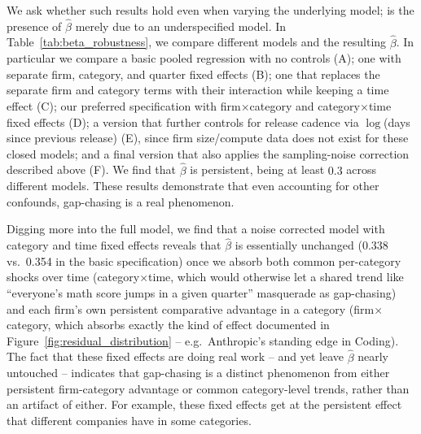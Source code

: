 We ask whether such results hold even when varying the underlying model; is the presence of $\hat{\beta}$ merely due to an underspecified model.
In Table~\ref{tab:beta_robustness}, we compare different models and the resulting $\hat{\beta}$.
In particular we compare a basic pooled regression with no controls (A); one with separate firm, category, and quarter fixed effects (B); one that replaces the separate firm and category terms with their interaction while keeping a time effect (C); our preferred specification with firm$\times$category and category$\times$time fixed effects (D); a version that further controls for release cadence via $\log$(days since previous release) (E), since firm size/compute data does not exist for these closed models; and a final version that also applies the sampling-noise correction described above (F).
We find that $\hat{\beta}$ is persistent, being at least $0.3$ across different models.
These results demonstrate that even accounting for other confounds, gap-chasing is a real phenomenon.

Digging more into the full model, we find that a noise corrected model with category and time fixed effects reveals that $\hat\beta$ is essentially unchanged (0.338 vs.\ 0.354 in the basic specification) once we absorb both common per-category shocks over time (category$\times$time, which would otherwise let a shared trend like ``everyone's math score jumps in a given quarter'' masquerade as gap-chasing) and each firm's own persistent comparative advantage in a category (firm$\times$category, which absorbs exactly the kind of effect documented in Figure~\ref{fig:residual_distribution} -- e.g.\ Anthropic's standing edge in Coding). The fact that these fixed effects are doing real work -- and yet leave $\hat\beta$ nearly untouched -- indicates that gap-chasing is a distinct phenomenon from either persistent firm-category advantage or common category-level trends, rather than an artifact of either.
For example, these fixed effects get at the persistent effect that different companies have in some categories.

